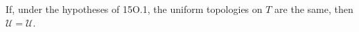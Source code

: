 If, under the hypotheses of 15O.1, the uniform topologies on $T$ are the same, then $\mathcal{U} = \mathcal{U}$.
